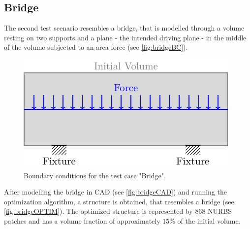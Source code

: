 \subsection{Bridge}
\label{ssec:bridge}
The second test scenario resembles a bridge, that is modelled through a volume resting on two supports and a plane - the intended driving plane - in the middle of the volume subjected to an area force (see \autoref{fig:bridgeBC}).
\begin{figure}[H]
\begin{center}
\includegraphics[scale=1]{Pictures/tikzBridge/bridge.pdf}
\end{center}
\caption{Boundary conditions for the test case "Bridge".}
\label{fig:bridgeBC}
\end{figure}
After modelling the bridge in CAD (see \autoref{fig:bridgeCAD}) and running the optimization algorithm, a structure is obtained, that resembles a bridge (see \autoref{fig:bridgeOPTIM}). The optimized structure is represented by $868$ NURBS patches and has a volume fraction of approximately $15\%$ of the initial volume.
